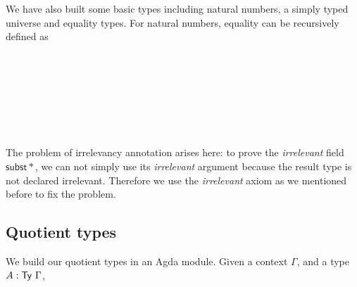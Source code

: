 We have also built some basic types including natural numbers, a simply typed universe and equality types.
For natural numbers, equality can be recursively defined as
\begin{code}
%
\\
\>[0]\<[2]%
\>[2] \AgdaSymbol{:}     \<%
\\
\>[0]\<[2]%
\>[2]   \AgdaSymbol{=} \<%
\\
\>[0]\<[2]%
\>[2]    \AgdaSymbol{=} \<%
\\
\>[0]\<[2]%
\>[2]    \AgdaSymbol{=} \<%
\\
\>[0]\<[2]%
\>[2]     \AgdaSymbol{=}   \<%
\\
\end{code}

The problem of irrelevancy annotation arises here: to prove the \emph{irrelevant} field $\mathsf{subst*}$, we can not simply use its \emph{irrelevant} argument because the result type is not declared irrelevant. Therefore we use the \emph{irrelevant} axiom as we mentioned before to fix the problem.


\begin{code}
\>[4]  \AgdaSymbol{=}  \AgdaBound{\_}    \<%
\end{code}


\subsection{Quotient types}

We build our quotient types in an Agda module.
Given a context $\Gamma$, and a type $A : \mathsf{Ty}~ \Gamma$, 

\begin{code}\>\<%
\\
\>  \AgdaSymbol{(} \AgdaSymbol{:} \AgdaSymbol{)(} \AgdaSymbol{:}  \AgdaSymbol{)}\<%
\\
\end{code}

